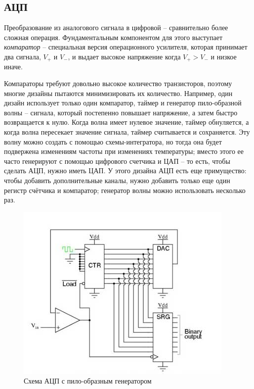 \documentclass[a4page]{article}
\begin{document}
\subsection{АЦП}
Преобразование из аналогового сигнала в цифровой -- сравнительно более сложная операция.
Фундаментальным компонентом для этого выступает \emph{компаратор} -- специальная версия операционного усилителя,
которая принимает два сигнала, $V_{+}$ и $V_{-}$,  и выдает высокое напряжение когда $V_{+}>V_{-}$ и низкое иначе.

Компараторы требуют довольно высокое количество транзисторов, поэтому многие дизайны пытаются минимизировать их количество.
Например, один дизайн использует только один компаратор, таймер и генератор пило-образной волны -- сигнала, который постепенно повышает напряжение,
а затем быстро возвращается к нулю.
Когда волна имеет нулевое значение, таймер обнуляется,
а когда волна пересекает значение сигнала, таймер считывается и сохраняется.
Эту волну можно создать с помощью схемы-интегратора,
но тогда она будет подвержена изменениям частоты при изменениях температуры;
вместо этого ее часто генерируют с помощью цифрового счетчика и ЦАП --
то есть, чтобы сделать АЦП, нужно иметь ЦАП.
У этого дизайна АЦП есть еще примущество: чтобы добавить дополнительные каналы, нужно добавить только еще один регистр счётчика и компаратор;
генератор волны можно использовать несколько раз.

\begin{figure}
    \includegraphics[width=\linewidth]{ramp-adc.jpg}
    \caption{Схема АЦП с пило-образным генератором~\cite{web:polytechnic-adc}}
    \label{fig:ramp-adc}
  \end{figure}
\end{document}
